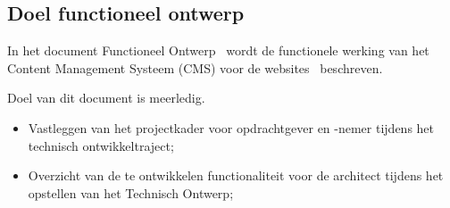 \subsection{Doel functioneel ontwerp}
In het document Functioneel Ontwerp \customerdomain \ wordt de functionele 
werking van het Content Management Systeem (CMS) voor de websites 
\customerdomain \ beschreven.

Doel van dit document is meerledig.

\begin{itemize}
  \item Vastleggen van het projectkader voor opdrachtgever en -nemer tijdens het 
  technisch ontwikkeltraject;
  \item Overzicht van de te ontwikkelen functionaliteit voor de architect 
  tijdens het opstellen van het Technisch Ontwerp;
\end{itemize}
